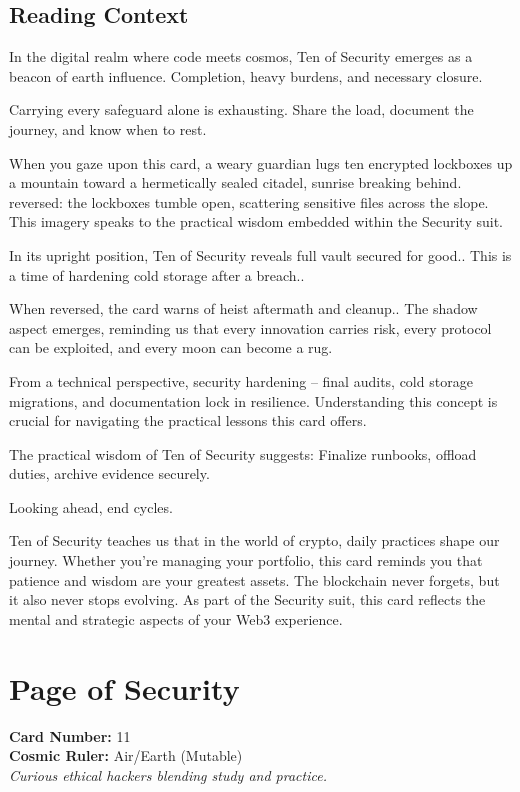 \documentclass[11pt,oneside]{book}
\begin{document}
\begin{minipage}[t]{0.55\textwidth}
  \subsection*{Reading Context}
  In the digital realm where code meets cosmos, Ten of Security emerges as a beacon of earth influence. Completion, heavy burdens, and necessary closure.

  Carrying every safeguard alone is exhausting. Share the load, document the journey, and know when to rest.

  When you gaze upon this card, a weary guardian lugs ten encrypted lockboxes up a mountain toward a hermetically sealed citadel, sunrise breaking behind. reversed: the lockboxes tumble open, scattering sensitive files across the slope. This imagery speaks to the practical wisdom embedded within the Security suit.

  In its upright position, Ten of Security reveals full vault secured for good.. This is a time of hardening cold storage after a breach..

  When reversed, the card warns of heist aftermath and cleanup.. The shadow aspect emerges, reminding us that every innovation carries risk, every protocol can be exploited, and every moon can become a rug.

  From a technical perspective, security hardening – final audits, cold storage migrations, and documentation lock in resilience. Understanding this concept is crucial for navigating the practical lessons this card offers.

  The practical wisdom of Ten of Security suggests: Finalize runbooks, offload duties, archive evidence securely.

  Looking ahead, end cycles.

  Ten of Security teaches us that in the world of crypto, daily practices shape our journey. Whether you're managing your portfolio, this card reminds you that patience and wisdom are your greatest assets. The blockchain never forgets, but it also never stops evolving. As part of the Security suit, this card reflects the mental and strategic aspects of your Web3 experience.

\end{minipage}

\newpage
\section*{Page of Security}

\begin{minipage}[t]{0.55\textwidth}
  \vspace{0pt}
  \textbf{Card Number:} 11\\  \textbf{Cosmic Ruler:} Air/Earth (Mutable)\\  \textit{Curious ethical hackers blending study and practice.}
\end{minipage}
\end{document}
